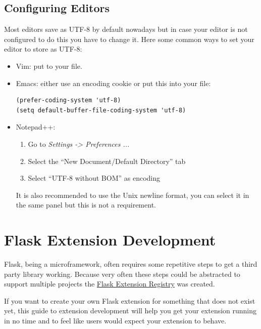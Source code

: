 \documentclass[a4paper,12pt]{sphinxmanual}
\begin{document}
\section{Configuring Editors}
\label{unicode:configuring-editors}
Most editors save as UTF-8 by default nowadays but in case your editor is
not configured to do this you have to change it.  Here some common ways to
set your editor to store as UTF-8:
\begin{itemize}
\item {} 
Vim: put  to your  file.

\item {} 
Emacs: either use an encoding cookie or put this into your 
file:

\begin{Verbatim}[commandchars=\\\{\}]
(prefer-coding-system 'utf-8)
(setq default-buffer-file-coding-system 'utf-8)
\end{Verbatim}

\item {} 
Notepad++:
\begin{enumerate}
\item {} 
Go to \emph{Settings -\textgreater{} Preferences ...}

\item {} 
Select the ``New Document/Default Directory'' tab

\item {} 
Select ``UTF-8 without BOM'' as encoding

\end{enumerate}

It is also recommended to use the Unix newline format, you can select
it in the same panel but this is not a requirement.

\end{itemize}


\chapter{Flask Extension Development}
\label{extensiondev:extension-dev}\label{extensiondev::doc}\label{extensiondev:flask-extension-development}
Flask, being a microframework, often requires some repetitive steps to get
a third party library working.  Because very often these steps could be
abstracted to support multiple projects the \href{http://flask.pocoo.org/extensions/}{Flask Extension Registry}
was created.

If you want to create your own Flask extension for something that does not
exist yet, this guide to extension development will help you get your
extension running in no time and to feel like users would expect your
extension to behave.
\end{document}
